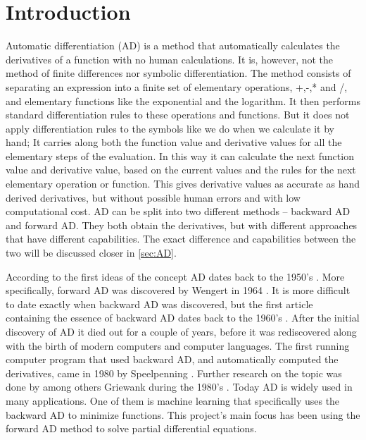 \chapter{Introduction}
Automatic differentiation (AD) is a method that automatically calculates the derivatives of a function with no human calculations. It is, however, not the method of finite differences nor symbolic differentiation. The method consists of separating an expression into a finite set of elementary operations, +,-,* and /, and elementary functions like the exponential and the logarithm. It then performs standard differentiation rules to these operations and functions. But it does not apply differentiation rules to the symbols like we do when we calculate it by hand; It carries along both the function value and derivative values for all the elementary steps of the evaluation. In this way it can calculate the next function value and derivative value, based on the current values and the rules for the next elementary operation or function. This gives derivative values as accurate as hand derived derivatives, but without possible human errors and with low computational cost. AD can be split into two different methods -- backward AD and forward AD. They both obtain the derivatives, but with different approaches that have different capabilities. The exact difference and capabilities between the two will be discussed closer in \autoref{sec:AD}. 

According to \emph{\cite{SurveyAD}} the first ideas of the concept AD dates back to the 1950's \emph{\citep{nolan1953analytical, beda1959programs}}. More specifically, forward AD was discovered by Wengert in 1964 \emph{\citep{wengert1964simple}}. It is more difficult to date exactly when backward AD was discovered, but the first article containing the essence of backward AD dates back to the 1960's \emph{\citep{boltyanskii1960theory}}. After the initial discovery of AD it died out for a couple of years, before it was rediscovered along with the birth of modern computers and computer languages. The first running computer program that used backward AD, and automatically computed the derivatives, came in 1980 by Speelpenning \emph{\citep{speelpenning1980compiling}}. Further research on the topic was done by among others Griewank during the 1980's \emph{\citep{griewank1989automatic}}. Today AD is widely used in many applications. One of them is machine learning that specifically uses the backward AD to minimize functions. This project's main focus has been using the forward AD method to solve partial differential equations. 

